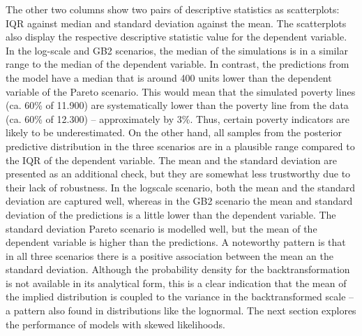 The other two columns show two pairs of descriptive statistics as scatterplots: IQR against median and standard deviation against the mean.
The scatterplots also display the respective descriptive statistic value for the dependent variable.
In the log-scale and GB2 scenarios, the median of the simulations is in a similar range to the median of the dependent variable.
In contrast, the predictions from the model have a median that is around 400 units lower than the dependent variable of the Pareto scenario.
This would mean that the simulated poverty lines (ca. 60\% of 11.900) are systematically lower than the poverty line from the data (ca. 60\% of 12.300) – approximately by 3\%.
Thus, certain poverty indicators are likely to be underestimated.
On the other hand, all samples from the posterior predictive distribution in the three scenarios are in a plausible range compared to the IQR of the dependent variable.
The mean and the standard deviation are presented as an additional check, but they are somewhat less trustworthy due to their lack of robustness.
In the logscale scenario, both the mean and the standard deviation are captured well, whereas in the GB2 scenario the mean and standard deviation of the predictions is a little lower than the dependent variable.
The standard deviation Pareto scenario is modelled well, but the mean of the dependent variable is higher than the predictions.
A noteworthy pattern is that in all three scenarios there is a positive association between the mean an the standard deviation.
Although the probability density for the backtransformation is not available in its analytical form, this is a clear indication that the mean of the implied distribution is coupled to the variance in the backtransformed scale – a pattern also found in distributions like the lognormal.
The next section explores the performance of models with skewed likelihoods.

